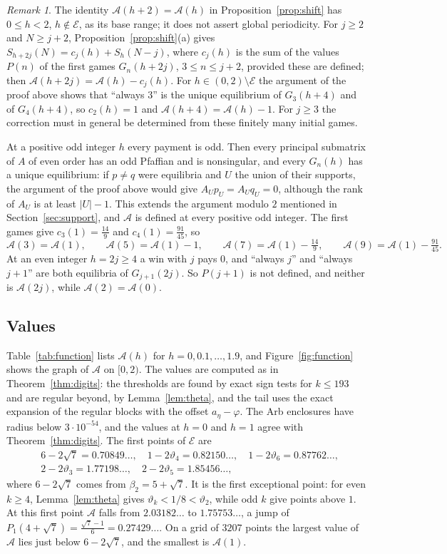 \documentclass[11pt]{article}
\theoremstyle{definition}
\theoremstyle{remark}
\newtheorem{remark}[theorem]{Remark}
\newcommand{\Alp}{\mathcal{A}}
\begin{document}
\begin{remark}\label{rem:integers}
The identity $\Alp(h+2)=\Alp(h)$ in Proposition~\ref{prop:shift} has
$0\le h<2$, $h\notin\mathcal E$, as its base range; it does not assert
global periodicity. For $j\ge2$ and $N\ge j+2$,
Proposition~\ref{prop:shift}(a) gives
$S_{h+2j}(N)=c_j(h)+S_h(N-j)$, where $c_j(h)$ is the sum of the values
$P(n)$ of the first games $G_n(h+2j)$, $3\le n\le j+2$, provided these
are defined; then $\Alp(h+2j)=\Alp(h)-c_j(h)$. For
$h\in(0,2)\setminus\mathcal E$ the argument
of the proof above shows that ``always $3$'' is the unique equilibrium
of $G_3(h+4)$ and of $G_4(h+4)$, so $c_2(h)=1$ and
$\Alp(h+4)=\Alp(h)-1$. For $j\ge3$ the correction must in general be
determined from these finitely many initial games.

At a positive odd integer $h$ every payment is odd. Then every principal
submatrix of $A$ of even order has an odd Pfaffian and is nonsingular,
and every $G_n(h)$ has a unique equilibrium: if $p\ne q$ were equilibria
and $U$ the union of their supports, the argument of the proof above
would give $A_Up_U=A_Uq_U=0$, although the rank of $A_U$ is at least
$|U|-1$. This extends the argument modulo $2$ mentioned in
Section~\ref{sec:support}, and $\Alp$ is defined at every positive odd integer.
The first games give $c_3(1)=\frac{14}9$ and $c_4(1)=\frac{91}{45}$, so
\[
\Alp(3)=\Alp(1),\qquad\Alp(5)=\Alp(1)-1,\qquad
\Alp(7)=\Alp(1)-\tfrac{14}9,\qquad\Alp(9)=\Alp(1)-\tfrac{91}{45}.
\]
At an even integer $h=2j\ge4$ a win with $j$ pays $0$, and ``always
$j$'' and ``always $j+1$'' are both equilibria of $G_{j+1}(2j)$. So
$P(j+1)$ is not defined, and neither is $\Alp(2j)$, while
$\Alp(2)=\Alp(0)$.
\end{remark}

\subsection*{Values}

Table~\ref{tab:function} lists $\Alp(h)$ for $h=0,0.1,\dots,1.9$, and
Figure~\ref{fig:function} shows the graph of $\Alp$ on $[0,2)$. The
values are computed as in Theorem~\ref{thm:digits}: the thresholds are
found by exact sign tests for $k\le193$ and are regular beyond, by
Lemma~\ref{lem:theta}, and the tail uses the exact expansion of the
regular blocks with the offset $a_\eta-\varphi$. The Arb enclosures have
radius below $3\cdot10^{-54}$, and the values at $h=0$ and $h=1$ agree
with Theorem~\ref{thm:digits}. The first points of $\mathcal E$ are
\[
\begin{aligned}
&6-2\sqrt7=0.70849\ldots,\quad 1-2\vartheta_4=0.82150\ldots,\quad
1-2\vartheta_6=0.87762\ldots,\\
&2-2\vartheta_3=1.77198\ldots,\quad 2-2\vartheta_5=1.85456\ldots,
\end{aligned}
\]
where $6-2\sqrt7$ comes from $\beta_2=5+\sqrt7$. It is the first
exceptional point: for even $k\ge4$, Lemma~\ref{lem:theta} gives
$\vartheta_k<1/8<\vartheta_2$, while odd $k$ give points above $1$.
At this first point
$\Alp$ falls from $2.03182\ldots$ to $1.75753\ldots$, a jump of
$P_1(4+\sqrt7)=\frac{\sqrt7-1}6=0.27429\ldots$. On a grid of $3207$
points the largest value of $\Alp$ lies just below $6-2\sqrt7$, and the
smallest is $\Alp(1)$.
\end{document}
